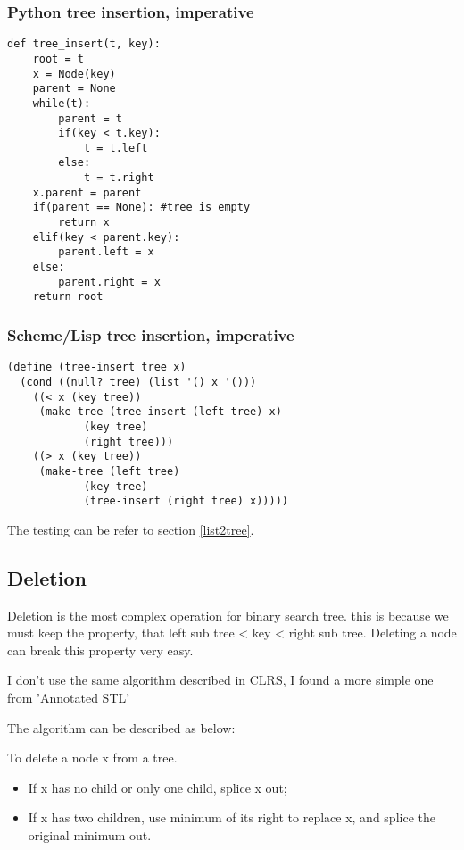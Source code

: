 \documentclass{article}
\begin{document}
\subsubsection*{Python tree insertion, imperative}

\lstset{language=Python}
\begin{lstlisting}
def tree_insert(t, key):
    root = t
    x = Node(key)
    parent = None
    while(t):
        parent = t
        if(key < t.key):
            t = t.left
        else:
            t = t.right
    x.parent = parent
    if(parent == None): #tree is empty
        return x
    elif(key < parent.key):
        parent.left = x
    else:
        parent.right = x
    return root
\end{lstlisting}

\subsubsection*{Scheme/Lisp tree insertion, imperative}

\lstset{language=lisp}
\begin{lstlisting}
(define (tree-insert tree x)
  (cond ((null? tree) (list '() x '()))
	((< x (key tree))
	 (make-tree (tree-insert (left tree) x)
		    (key tree)
		    (right tree)))
	((> x (key tree))
	 (make-tree (left tree)
		    (key tree)
		    (tree-insert (right tree) x)))))
\end{lstlisting}

The testing can be refer to section \ref{list2tree}.

\subsection{Deletion}
Deletion is the most complex operation for binary search tree. this is because we
must keep the property, that left sub tree < key < right sub tree. Deleting a node
can break this property very easy.

I don't use the same algorithm described in CLRS\cite{CLRS}, I found a more simple
one from 'Annotated STL'\cite{hj-stl}

The algorithm can be described as below:

To delete a node x from a tree.
\begin{itemize}
\item If x has no child or only one child, splice x out;
\item If x has two children, use minimum of its right to replace x, 
and splice the original minimum out.
\end{itemize}
\end{document}
